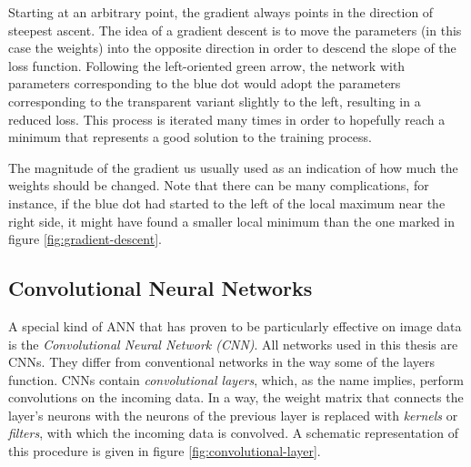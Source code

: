 \documentclass[11pt, a4paper]{article}
\begin{document}
Starting at an arbitrary point, the gradient always points in the direction of steepest ascent. The idea of a gradient descent is to move the parameters (in this case the weights) into the opposite direction in order to descend the slope of the loss function. Following the left-oriented green arrow, the network with parameters corresponding to the blue dot would adopt the parameters corresponding to the transparent variant slightly to the left, resulting in a reduced loss. This process is iterated many times in order to hopefully reach a minimum that represents a good solution to the training process.

The magnitude of the gradient us usually used as an indication of how much the weights should be changed. Note that there can be many complications, for instance, if the blue dot had started to the left of the local maximum near the right side, it might have found a smaller local minimum than the one marked in figure \ref{fig:gradient-descent}.











\subsection{Convolutional Neural Networks}
A special kind of ANN that has proven to be particularly effective on image data is the \emph{Convolutional Neural Network (CNN)}. All networks used in this thesis are CNNs. They differ from conventional networks in the way some of the layers function. CNNs contain \emph{convolutional layers}, which, as the name implies, perform convolutions on the incoming data. In a way, the weight matrix that connects the layer's neurons with the neurons of the previous layer is replaced with \emph{kernels} or \emph{filters}, with which the incoming data is convolved. A schematic representation of this procedure is given in figure \ref{fig:convolutional-layer}.
\end{document}
